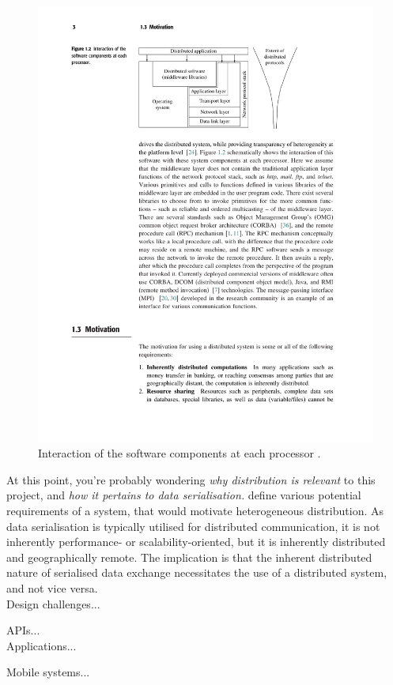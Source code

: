 \documentclass[../report.tex]{subfiles}
\begin{document}
\begin{figure}[h!]
\centering
\includegraphics[width=0.8\linewidth]{figures/processinteraction.pdf}
\caption{Interaction of the software components at each processor \cite[3]{kshemkalyani2011distributed}.}
\label{fig:processinteraction}
\end{figure}

At this point, you're probably wondering \textit{why distribution is relevant} to this project, and \textit{how it pertains to data serialisation.} \cite{kshemkalyani2011distributed} define various potential requirements of a system, that would motivate heterogeneous distribution. As data serialisation is typically utilised for distributed communication, it is not inherently performance- or scalability-oriented, but it is inherently distributed and geographically remote. The implication is that the inherent distributed nature of serialised data exchange necessitates the use of a distributed system, and not vice versa. \\

Design challenges...

APIs... \\

Applications...

Mobile systems...
\end{document}
